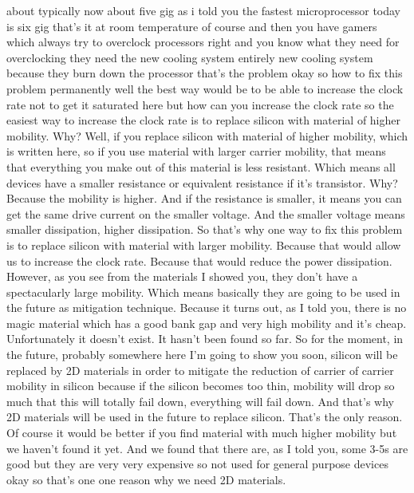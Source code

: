 about typically now about five gig as i told you the fastest microprocessor today is six gig that's it at room temperature of course and then you have gamers which always try to overclock processors right and you know what they need for overclocking they need the new cooling system entirely new cooling system because they burn down the processor that's the problem okay so how to fix this problem permanently well the best way would be to be able to increase the clock rate not to get it saturated here but how can you increase the clock rate so the easiest way to increase the clock rate is to replace silicon with material of higher mobility. Why? Well, if you replace silicon with material of higher mobility, which is written here, so if you use material with larger carrier mobility, that means that everything you make out of this material is less resistant. Which means all devices have a smaller resistance or equivalent resistance if it's transistor. Why? Because the mobility is higher. And if the resistance is smaller, it means you can get the same drive current on the smaller voltage. And the smaller voltage means smaller dissipation, higher dissipation. So that's why one way to fix this problem is to replace silicon with material with larger mobility. Because that would allow us to increase the clock rate. Because that would reduce the power dissipation. However, as you see from the materials I showed you, they don't have a spectacularly large mobility. Which means basically they are going to be used in the future as mitigation technique. Because it turns out, as I told you, there is no magic material which has a good bank gap and very high mobility and it's cheap. Unfortunately it doesn't exist. It hasn't been found so far. So for the moment, in the future, probably somewhere here I'm going to show you soon, silicon will be replaced by 2D materials in order to mitigate the reduction of carrier of carrier mobility in silicon because if the silicon becomes too thin, mobility will drop so much that this will totally fail down, everything will fail down. And that's why 2D materials will be used in the future to replace silicon. That's the only reason. Of course it would be better if you find material with much higher mobility but we haven't found it yet. And we found that there are, as I told you, some 3-5s are good but they are very very expensive so not used for general purpose devices okay so that's one one reason why we need 2D materials.

